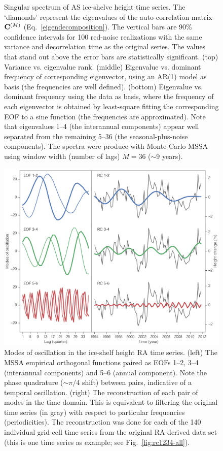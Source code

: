 \begin{figure}
  \captionsetup{labelformat=adja-page}
  \caption[Singular spectrum of AS ice-shelve height time-series]{
  Singular spectrum of AS ice-shelve height time series. The `diamonds' represent the eigenvalues of the auto-correlation matrix $\mathbf{C}^{(M)}$ (Eq.~\ref{eigendecomposition}). The vertical bars are 90\% confidence intervals for 100 red-noise realizations with the same variance and decorrelation time as the original series. The values that stand out above the error bars are statistically significant. (top) Variance vs. eigenvalue rank. (middle) Eigenvalue vs. dominant frequency of corresponding eigenvector, using an AR(1) model as basis (the frequencies are well defined). (bottom) Eigenvalue vs. dominant frequency using the data as basis, where the frequency of each eigenvector is obtained by least-square fitting the corresponding EOF to a sine function (the frequencies are approximated). Note that eigenvalues 1--4 (the interannual components) appear well separated from the remaining 5--36 (the seasonal-plus-noise components). The spectra were produce with Monte-Carlo MSSA using window width (number of lags) $M=36$ ($\sim$9 years).
  }
  \label{c4f3}
\end{figure}


\begin{figure}[!h]
  \centering
  \includegraphics[width=\textwidth]{img/mssa_eof_rc_v2.png}
  \caption[Modes of oscillation in the ice-shelf height time-series]{
  Modes of oscillation in the ice-shelf height RA time series. (left) The MSSA empirical orthogonal functions paired as EOFs 1--2, 3--4 (interannual components) and 5--6 (annual component). Note the phase quadrature ($\sim$$\pi/4$ shift) between pairs, indicative of a temporal oscillation. (right) The reconstruction of each pair of modes in the time domain. This is equivalent to filtering the original time series (in gray) with respect to particular frequencies (periodicities). The reconstruction was done for each of the 140 individual grid-cell time series from the original RA-derived data set (this is one time series as example; see Fig.~\ref{fig:rc1234-all}).
  }
  \label{c4f4}
\end{figure}


